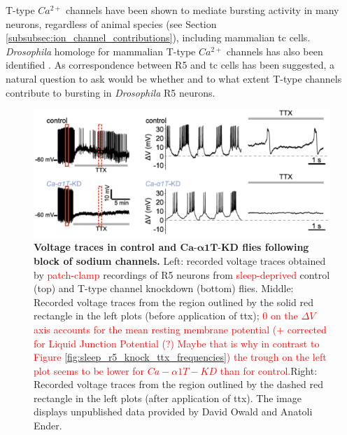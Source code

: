 \documentclass[../main.tex]{subfiles}
\begin{document}
T-type $Ca^{2+}$ channels have been shown to mediate bursting activity in many neurons, regardless of animal species (see Section \ref{subsubsec:ion_channel_contributions}), including mammalian \gls{tc} cells.  \textit{Drosophila} homologe for mammalian T-type $Ca^{2+}$ channels has also been identified \cite{jeongCaa1TFlyTtype2015}.
As correspondence between R5 and \gls{tc} cells has been suggested, a natural question to ask would be whether and to what extent T-type channels contribute to bursting in \textit{Drosophila} R5 neurons.

\begin{figure}[!t]
    \centering
    \includegraphics[width=0.98\linewidth]{../img/sleep_and_r5_network/CaaT_knock_and_ttx/voltage_traces_labelled.png}
    \caption[Voltage traces in control and $Ca\text{-}\alpha1T\text{-KD}$ flies following block of sodium channels]{
        \textbf{Voltage traces in control and $\bm{Ca\text{-}\alpha1T\text{-KD}}$ flies following block of sodium channels.}
        Left: recorded voltage traces obtained by \textcolor{red}{patch-clamp} recordings of R5 neurons from \textcolor{red}{sleep-deprived} control (top) and T-type channel knockdown (bottom) flies.
        Middle: Recorded voltage traces from the region outlined by the solid red rectangle in the left plots (before application of \gls{ttx}); \textcolor{red}{$0$ on the $\Delta V$ axis accounts for the mean resting membrane potential (+ corrected for Liquid Junction Potential (?) Maybe that is why in contrast to Figure \ref{fig:sleep_r5_knock_ttx_frequencies}) the trough on the left plot seems to be lower for $Ca-\alpha1T-KD$ than for control.}Right: Recorded voltage traces from the region outlined by the dashed red rectangle in the left plots (after application of \gls{ttx}). The image displays unpublished data provided by David Owald and Anatoli Ender.
    }
    \label{fig:sleep_r5_knock_ttx_voltage}
\end{figure}
\end{document}
